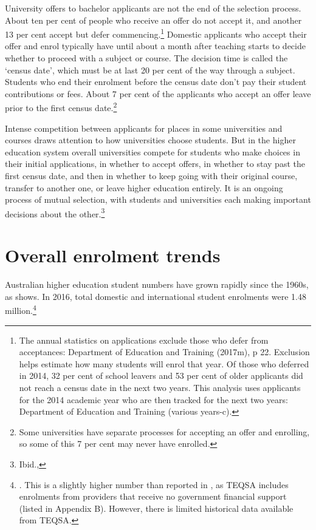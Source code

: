 \documentclass{grattan}
\begin{document}
University offers to bachelor applicants are not the end of the selection process. About ten per cent of people who receive an offer do not accept it, and another 13 per cent accept but defer commencing.\footnote{The annual statistics on applications exclude those who defer from acceptances: Department of Education and Training (2017m), p 22. Exclusion helps estimate how many students will enrol that year. Of those who deferred in 2014, 32 per cent of school leavers and 53 per cent of older applicants did not reach a census date in the next two years. This analysis uses applicants for the 2014 academic year who are then tracked for the next two years: Department of Education and Training (various years-c).} Domestic applicants who accept their offer and enrol typically have until about a month after teaching starts to decide whether to proceed with a subject or course. The decision time is called the `census date', which must be at last 20 per cent of the way through a subject. Students who end their enrolment before the census date don't pay their student contributions or fees. About 7 per cent of the applicants who accept an offer leave prior to the first census date.\footnote{\textcite[][section~6.2.]{Norton2018droppingouttheb} Some universities have separate processes for accepting an offer and enrolling, so some of this 7 per cent may never have enrolled.}

Intense competition between applicants for places in some universities and courses draws attention to how universities choose students. But in the higher education system overall universities compete for students who make choices in their initial applications, in whether to accept offers, in whether to stay past the first census date, and then in whether to keep going with their original course, transfer to another one, or leave higher education entirely. It is an ongoing process of mutual selection, with students and universities each making important decisions about the other.\footnote{Ibid., }

%
\section{Overall enrolment trends}\label{sec:overall-enrolment-trends}

Australian higher education student numbers have grown rapidly since the 1960s, as  shows. In 2016, total domestic and international student enrolments were 1.48 million.\footnote{\textcite[][]{TEQSA2018teqsasriskassess}. This is a slightly higher number than reported in , as TEQSA includes enrolments from providers that receive no government financial support (listed in Appendix B). However, there is limited historical data available from TEQSA.}
\end{document}
